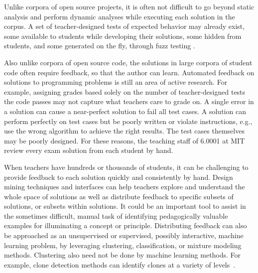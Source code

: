 Unlike corpora of open source projects, it is often not difficult to go beyond static analysis and perform dynamic analyses while executing each solution in the corpus. A set of teacher-designed tests of expected behavior may already exist, some available to students while developing their solutions, some hidden from students, and some generated on the fly, through fuzz testing \cite{fuzztesting}. %

Also unlike corpora of open source code, the solutions in large corpora of student code often require feedback, so that the author can learn. Automated feedback on solutions to programming problems is still an area of active research. For example, assigning grades based solely on the number of teacher-designed tests the code passes may not capture what teachers care to grade on. A single error in a solution can cause a near-perfect solution to fail all test cases. A solution can perform perfectly on test cases but be poorly written or violate instructions, e.g., use the wrong algorithm to achieve the right results. The test cases themselves may be poorly designed. For these reasons, the teaching staff of 6.0001 at MIT review every exam solution from each student by hand.

When teachers have hundreds or thousands of students, it can be challenging to provide feedback to each solution quickly and consistently by hand. Design mining techniques and interfaces can help teachers explore and understand the whole space of solutions as well as distribute feedback to specific subsets of solutions, or subsets within solutions. It could be an important tool to assist in the sometimes difficult, manual task of identifying pedagogically valuable examples for illuminating a concept or principle. Distributing feedback can also be approached as an unsupervised or supervised, possibly interactive, machine learning problem, by leveraging clustering, classification, or mixture modeling methods. Clustering also need not be done by machine learning methods. For example, clone detection methods can identify clones at a variety of levels~\cite{roy2009comparison}.


